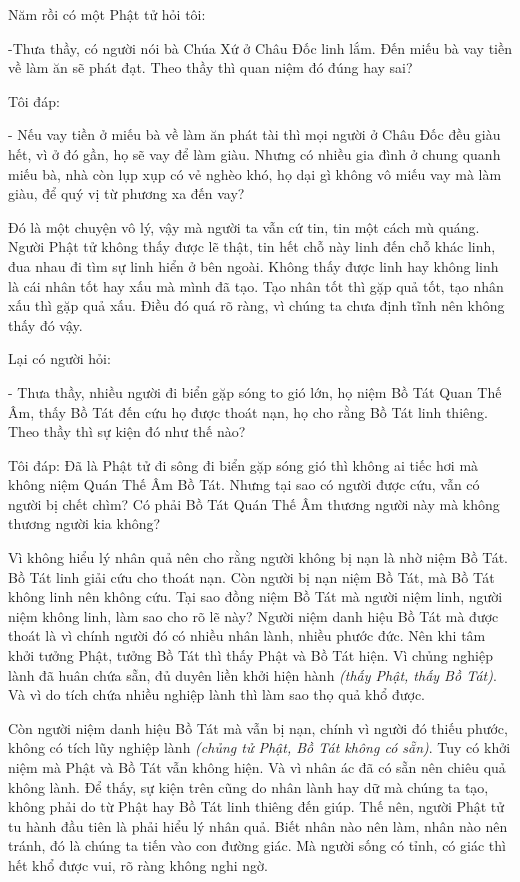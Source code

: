 \documentclass[
  12pt,
  oneside]{book}
\begin{document}
Năm rồi có một Phật tử hỏi tôi:

-Thưa thầy, có người nói bà Chúa Xứ ở Châu Đốc linh lắm. Đến miếu bà vay tiền về làm ăn sẽ phát đạt. Theo thầy thì quan niệm đó đúng hay sai?

Tôi đáp:

- Nếu vay tiền ở miếu bà về làm ăn phát tài thì mọi người ở Châu Đốc đều giàu hết, vì ở đó gần, họ sẽ vay để làm giàu. Nhưng có nhiều gia đình ở chung quanh miếu bà, nhà còn lụp xụp có vẻ nghèo khó, họ dại gì không vô miếu vay mà làm giàu, để quý vị từ phương xa đến vay?

Đó là một chuyện vô lý, vậy mà người ta vẫn cứ tin, tin một cách mù quáng. Người Phật tử không thấy được lẽ thật, tin hết chỗ này linh đến chỗ khác linh, đua nhau đi tìm sự linh hiển ở bên ngoài. Không thấy được linh hay không linh là cái nhân tốt hay xấu mà mình đã tạo. Tạo nhân tốt thì gặp quả tốt, tạo nhân xấu thì gặp quả xấu. Điều đó quá rõ ràng, vì chúng ta chưa định tĩnh nên không thấy đó vậy.

Lại có người hỏi:

- Thưa thầy, nhiều người đi biển gặp sóng to gió lớn, họ niệm Bồ Tát Quan Thế Âm, thấy Bồ Tát đến cứu họ được thoát nạn, họ cho rằng Bồ Tát linh thiêng. Theo thầy thì sự kiện đó như thế nào?

Tôi đáp: Đã là Phật tử đi sông đi biển gặp sóng gió thì không ai tiếc hơi mà không niệm Quán Thế Âm Bồ Tát. Nhưng tại sao có người được cứu, vẫn có người bị chết chìm? Có phải Bồ Tát Quán Thế Âm thương người này mà không thương người kia không?

Vì không hiểu lý nhân quả nên cho rằng người không bị nạn là nhờ niệm Bồ Tát. Bồ Tát linh giải cứu cho thoát nạn. Còn người bị nạn niệm Bồ Tát, mà Bồ Tát không linh nên không cứu. Tại sao đồng niệm Bồ Tát mà người niệm linh, người niệm không linh, làm sao cho rõ lẽ này? Người niệm danh hiệu Bồ Tát mà được thoát là vì chính người đó có nhiều nhân lành, nhiều phước đức. Nên khi tâm khởi tưởng Phật, tưởng Bồ Tát thì thấy Phật và Bồ Tát hiện. Vì chủng nghiệp lành đã huân chứa sẵn, đủ duyên liền khởi hiện hành \emph{(thấy Phật, thấy Bồ Tát)}. Và vì do tích chứa nhiều nghiệp lành thì làm sao thọ quả khổ được.

Còn người niệm danh hiệu Bồ Tát mà vẫn bị nạn, chính vì người đó thiếu phước, không có tích lũy nghiệp lành \emph{(chủng tử Phật, Bồ Tát không có sẵn)}. Tuy có khởi niệm mà Phật và Bồ Tát vẫn không hiện. Và vì nhân ác đã có sẵn nên chiêu quả không lành. Để thấy, sự kiện trên cũng do nhân lành hay dữ mà chúng ta tạo, không phải do từ Phật hay Bồ Tát linh thiêng đến giúp. Thế nên, người Phật tử tu hành đầu tiên là phải hiểu lý nhân quả. Biết nhân nào nên làm, nhân nào nên tránh, đó là chúng ta tiến vào con đường giác. Mà người sống có tỉnh, có giác thì hết khổ được vui, rõ ràng không nghi ngờ.
\end{document}
